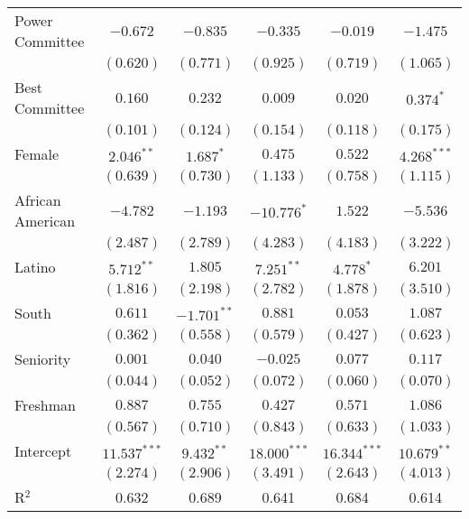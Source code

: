\documentclass[12pt]{article}
\begin{document}
\begin{table}[H]
\begin{center}
\begin{tabular}{l c c c c c }
			Power Committee       & $-0.672$       & $-0.835$      & $-0.335$       & $-0.019$       & $-1.475$      \\
			& $(0.620)$      & $(0.771)$     & $(0.925)$      & $(0.719)$      & $(1.065)$     \\
			Best Committee        & $0.160$        & $0.232$       & $0.009$        & $0.020$        & $0.374^{*}$   \\
			& $(0.101)$      & $(0.124)$     & $(0.154)$      & $(0.118)$      & $(0.175)$     \\
			Female                 & $2.046^{**}$   & $1.687^{*}$   & $0.475$        & $0.522$        & $4.268^{***}$ \\
			& $(0.639)$      & $(0.730)$     & $(1.133)$      & $(0.758)$      & $(1.115)$     \\
			African American                   & $-4.782$       & $-1.193$      & $-10.776^{*}$  & $1.522$        & $-5.536$      \\
			& $(2.487)$      & $(2.789)$     & $(4.283)$      & $(4.183)$      & $(3.222)$     \\
			Latino                 & $5.712^{**}$   & $1.805$       & $7.251^{**}$   & $4.778^{*}$    & $6.201$       \\
			& $(1.816)$      & $(2.198)$     & $(2.782)$      & $(1.878)$      & $(3.510)$     \\
			South                  & $0.611$        & $-1.701^{**}$ & $0.881$        & $0.053$        & $1.087$       \\
			& $(0.362)$      & $(0.558)$     & $(0.579)$      & $(0.427)$      & $(0.623)$     \\
			Seniority              & $0.001$        & $0.040$       & $-0.025$       & $0.077$        & $0.117$       \\
			& $(0.044)$      & $(0.052)$     & $(0.072)$      & $(0.060)$      & $(0.070)$     \\
			Freshman               & $0.887$        & $0.755$       & $0.427$        & $0.571$        & $1.086$       \\
			& $(0.567)$      & $(0.710)$     & $(0.843)$      & $(0.633)$      & $(1.033)$     \\
			Intercept            & $11.537^{***}$ & $9.432^{**}$  & $18.000^{***}$ & $16.344^{***}$ & $10.679^{**}$ \\
			& $(2.274)$      & $(2.906)$     & $(3.491)$      & $(2.643)$      & $(4.013)$     \\
			\hline
			R$^2$                  & 0.632          & 0.689         & 0.641          & 0.684          & 0.614         \\

\end{tabular}
\end{center}
\end{table}
\end{document}
